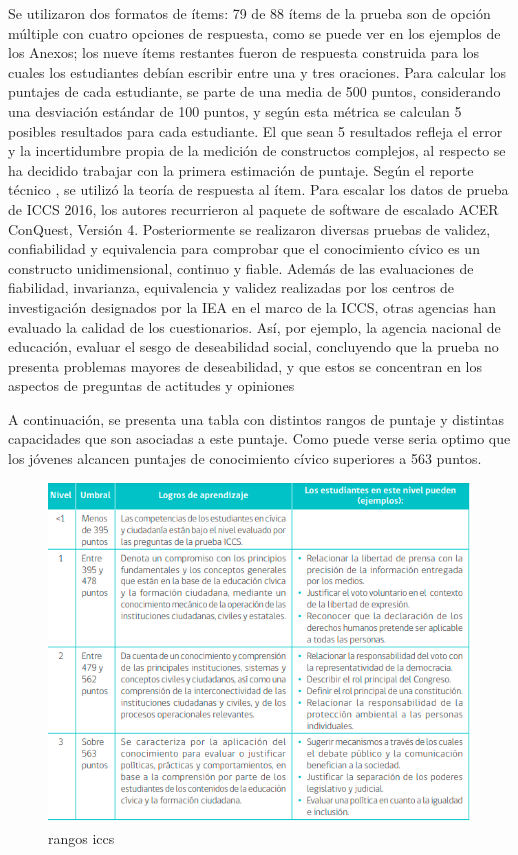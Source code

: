 \documentclass[12pt,twoside]{templates/facsothesis}
\begin{document}
Se utilizaron dos formatos de ítems: 79 de 88 ítems de la prueba son de opción múltiple con cuatro opciones de respuesta, como se puede ver en los ejemplos de los Anexos; los nueve ítems restantes fueron de respuesta construida para los cuales los estudiantes debían escribir entre una y tres oraciones. Para calcular los puntajes de cada estudiante, se parte de una media de 500 puntos, considerando una desviación estándar de 100 puntos, y según esta métrica se calculan 5 posibles resultados para cada estudiante. El que sean 5 resultados refleja el error y la incertidumbre propia de la medición de constructos complejos, al respecto se ha decidido trabajar con la primera estimación de puntaje. Según el reporte técnico \citep{schulzICCS2016Technical2016}, se utilizó la teoría de respuesta al ítem. Para escalar los datos de prueba de ICCS 2016, los autores recurrieron al paquete de software de escalado ACER ConQuest, Versión 4. Posteriormente se realizaron diversas pruebas de validez, confiabilidad y equivalencia para comprobar que el conocimiento cívico es un constructo unidimensional, continuo y fiable.
Además de las evaluaciones de fiabilidad, invarianza, equivalencia y validez realizadas por los centros de investigación designados por la IEA en el marco de la ICCS, otras agencias han evaluado la calidad de los cuestionarios. Así, por ejemplo, la agencia nacional de educación, evaluar el sesgo de deseabilidad social, concluyendo que la prueba no presenta problemas mayores de deseabilidad, y que estos se concentran en los aspectos de preguntas de actitudes y opiniones \citep{mineducImpactoDeseabilidadSocial2009}

A continuación, se presenta una tabla con distintos rangos de puntaje y distintas capacidades que son asociadas a este puntaje. Como puede verse seria optimo que los jóvenes alcancen puntajes de conocimiento cívico superiores a 563 puntos.

\begin{figure}

{\centering \includegraphics[width=0.8\linewidth]{images/puntajesdecorteiccs} 

}

\caption{rangos iccs}\label{fig:unnamed-chunk-4}
\end{figure}
\end{document}
